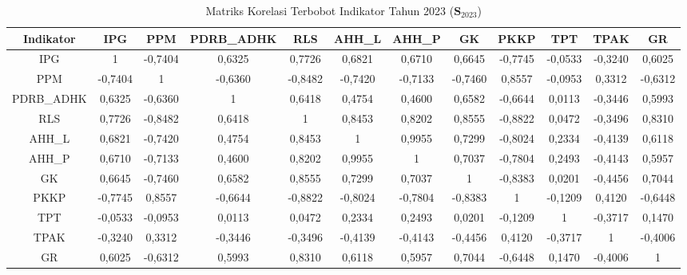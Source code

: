 \begin{table}[H]
\centering
\caption{Matriks Korelasi Terbobot Indikator Tahun 2023 ($\mathbf{S}_{2023}$)} \label{tab:app1matriks_intra_loading_2023}
\begin{adjustbox}{max width=\textwidth, max height=0.85\textheight}
\begin{tabular}{|c|c|c|c|c|c|c|c|c|c|c|c|}
\hline
\textbf{Indikator} & \textbf{IPG} & \textbf{PPM} & \textbf{PDRB\_ADHK} & \textbf{RLS} & \textbf{AHH\_L} & \textbf{AHH\_P} & \textbf{GK} & \textbf{PKKP} & \textbf{TPT} & \textbf{TPAK} & \textbf{GR} \\
\hline
IPG & 1 & -0,7404 & 0,6325 & 0,7726 & 0,6821 & 0,6710 & 0,6645 & -0,7745 & -0,0533 & -0,3240 & 0,6025 \\
PPM & -0,7404 & 1 & -0,6360 & -0,8482 & -0,7420 & -0,7133 & -0,7460 & 0,8557 & -0,0953 & 0,3312 & -0,6312 \\
PDRB\_ADHK & 0,6325 & -0,6360 & 1 & 0,6418 & 0,4754 & 0,4600 & 0,6582 & -0,6644 & 0,0113 & -0,3446 & 0,5993 \\
RLS & 0,7726 & -0,8482 & 0,6418 & 1 & 0,8453 & 0,8202 & 0,8555 & -0,8822 & 0,0472 & -0,3496 & 0,8310 \\
AHH\_L & 0,6821 & -0,7420 & 0,4754 & 0,8453 & 1 & 0,9955 & 0,7299 & -0,8024 & 0,2334 & -0,4139 & 0,6118 \\
AHH\_P & 0,6710 & -0,7133 & 0,4600 & 0,8202 & 0,9955 & 1 & 0,7037 & -0,7804 & 0,2493 & -0,4143 & 0,5957 \\
GK & 0,6645 & -0,7460 & 0,6582 & 0,8555 & 0,7299 & 0,7037 & 1 & -0,8383 & 0,0201 & -0,4456 & 0,7044 \\
PKKP & -0,7745 & 0,8557 & -0,6644 & -0,8822 & -0,8024 & -0,7804 & -0,8383 & 1 & -0,1209 & 0,4120 & -0,6448 \\
TPT & -0,0533 & -0,0953 & 0,0113 & 0,0472 & 0,2334 & 0,2493 & 0,0201 & -0,1209 & 1 & -0,3717 & 0,1470 \\
TPAK & -0,3240 & 0,3312 & -0,3446 & -0,3496 & -0,4139 & -0,4143 & -0,4456 & 0,4120 & -0,3717 & 1 & -0,4006 \\
GR & 0,6025 & -0,6312 & 0,5993 & 0,8310 & 0,6118 & 0,5957 & 0,7044 & -0,6448 & 0,1470 & -0,4006 & 1 \\
\hline
\end{tabular}
\end{adjustbox}
\end{table}